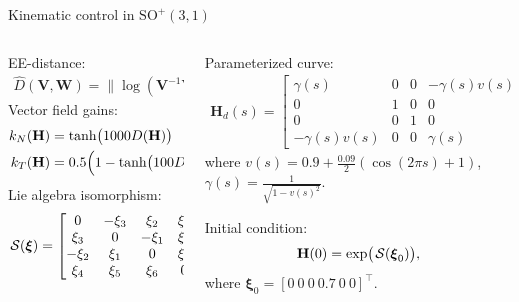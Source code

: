 \begin{frame}{Kinematic control in $\text{SO}^+(3,1)$}
    \begin{columns}[t]
        \begin{column}{0.5\linewidth}
            EE-distance:
            \begin{align*}
                \widehat{D}(\mathbf{V},\mathbf{W}) = \bigl\|\log(\mathbf{V}^{-1}\mathbf{W})\bigr\|_F
            \end{align*}
            Vector field gains:
            \begin{align*}
                k_N(\mathbf{H}) &= \tanh\bigl(\num{1000}D(\mathbf{H})\bigr)\\
                k_T(\mathbf{H}) &= 0.5\Bigl(1 - \tanh\bigl(100D(\mathbf{H})\bigr)\Bigr).
            \end{align*}
            Lie algebra isomorphism:
            \begin{align*}
                \SL[\boldsymbol{\xi}] = \begin{bmatrix}
                    0 & -\xi_3 & \xi_2 & \xi_4 \\
                    \xi_3 & 0 & -\xi_1 & \xi_5 \\
                    -\xi_2 & \xi_1 & 0 & \xi_6 \\
                    \xi_4 & \xi_5 & \xi_6 & 0
                \end{bmatrix}.
            \end{align*}
        \end{column}
        \begin{column}{0.5\linewidth}
            Parameterized curve:
            \begin{align*}
                \mathbf{H}_d(s) = \begin{bmatrix}
                    \gamma(s) & 0 & 0 & -\gamma(s) v(s)\\
                    0 & 1 & 0 & 0\\
                    0 & 0 & 1 & 0\\
                    -\gamma(s) v(s) & 0 & 0 & \gamma(s)
                \end{bmatrix},\label{eq:results-lorentz-curve-parametrization}
            \end{align*}
            where $v(s) = 0.9 + \frac{0.09}{2}(\cos(2\pi s) + 1)$, $\gamma(s) = \frac{1}{\sqrt{1 - v(s)^2}}$.
            
            Initial condition:
            \begin{align*}
                \mathbf{H}(0) = \exp\bigl(\SL[\boldsymbol{\xi}_0]\bigr),
            \end{align*}
            where $\boldsymbol{\xi}_0 = [0\ 0\ 0\ 0.7\ 0\ 0]^\top$.
        \end{column}

    \end{columns}
\end{frame}

